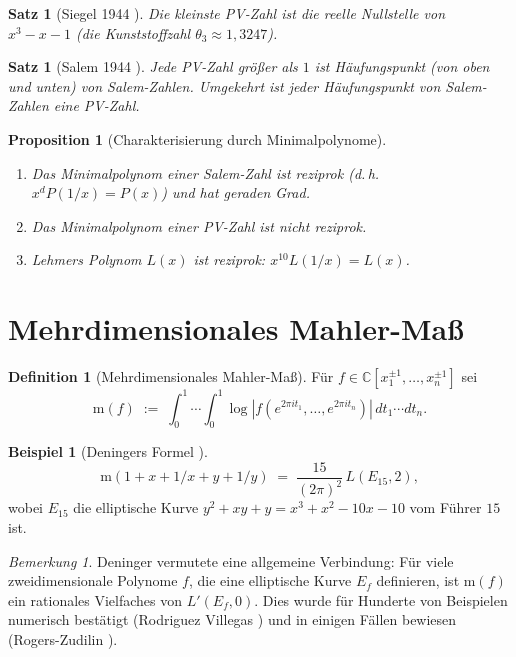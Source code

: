 \documentclass[12pt,a4paper]{amsart}
\newtheorem{proposition}[theorem]{Proposition}
\newtheorem{satz}[theorem]{Satz}
\theoremstyle{definition}
\newtheorem{definition_de}[theorem]{Definition}
\newtheorem{example}[theorem]{Beispiel}
\theoremstyle{remark}
\newtheorem{bemerkung}[theorem]{Bemerkung}
\newcommand{\C}{\mathbb{C}}
\newcommand{\m}{\mathrm{m}}
\begin{document}
\begin{satz}[Siegel 1944 \cite{Siegel1944}]
  Die kleinste PV-Zahl ist die reelle Nullstelle von $x^3 - x - 1$
  (die \emph{Kunststoffzahl} $\theta_3 \approx 1{,}3247$).
\end{satz}

\begin{satz}[Salem 1944 \cite{Salem1944}]
  Jede PV-Zahl größer als $1$ ist Häufungspunkt (von oben und unten) von Salem-Zahlen.
  Umgekehrt ist jeder Häufungspunkt von Salem-Zahlen eine PV-Zahl.
\end{satz}

\begin{proposition}[Charakterisierung durch Minimalpolynome]
  \begin{enumerate}[label=(\roman*)]
    \item Das Minimalpolynom einer Salem-Zahl ist reziprok (d.\,h.\ $x^d P(1/x) = P(x)$)
      und hat geraden Grad.
    \item Das Minimalpolynom einer PV-Zahl ist nicht reziprok.
    \item Lehmers Polynom $L(x)$ ist reziprok: $x^{10}L(1/x) = L(x)$.
  \end{enumerate}
\end{proposition}

\section{Mehrdimensionales Mahler-Maß}\label{sec:mehrere_variablen}

\begin{definition_de}[Mehrdimensionales Mahler-Maß]
  Für $f \in \C[x_1^{\pm 1},\ldots,x_n^{\pm 1}]$ sei
  \[
    \m(f) \;:=\; \int_0^1\cdots\int_0^1
    \log|f(e^{2\pi it_1},\ldots,e^{2\pi it_n})|\,dt_1\cdots dt_n.
  \]
\end{definition_de}

\begin{example}[Deningers Formel \cite{Deninger1997}]
  \[
    \m(1+x+1/x+y+1/y) \;=\; \frac{15}{(2\pi)^2}\, L(E_{15}, 2),
  \]
  wobei $E_{15}$ die elliptische Kurve $y^2 + xy + y = x^3 + x^2 - 10x - 10$
  vom Führer $15$ ist.
\end{example}

\begin{bemerkung}
  Deninger \cite{Deninger1997} vermutete eine allgemeine Verbindung: Für viele
  zweidimensionale Polynome $f$, die eine elliptische Kurve $E_f$ definieren, ist
  $\m(f)$ ein rationales Vielfaches von $L'(E_f, 0)$.
  Dies wurde für Hunderte von Beispielen numerisch bestätigt (Rodriguez Villegas
  \cite{RV1999}) und in einigen Fällen bewiesen (Rogers-Zudilin \cite{RZ2012}).
\end{bemerkung}
\end{document}
